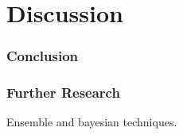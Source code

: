 \newpage
\part{Discussion}
\section{Conclusion}

\section{Further Research}

Ensemble and bayesian techniques.